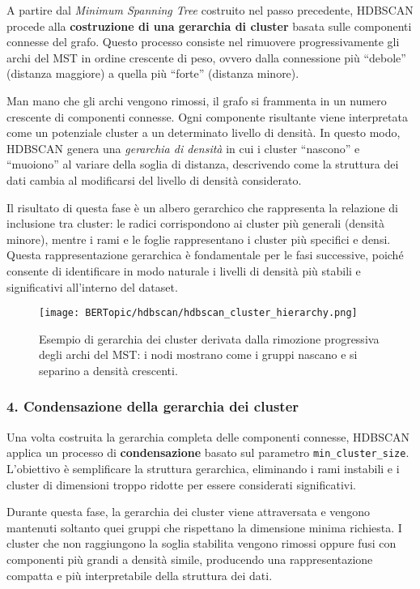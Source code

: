 A partire dal \textit{Minimum Spanning Tree} costruito nel passo precedente, HDBSCAN procede alla \textbf{costruzione di una gerarchia di cluster} basata sulle componenti connesse del grafo. 
Questo processo consiste nel rimuovere progressivamente gli archi del MST in ordine crescente di peso, ovvero dalla connessione più ``debole'' (distanza maggiore) a quella più ``forte'' (distanza minore).

Man mano che gli archi vengono rimossi, il grafo si frammenta in un numero crescente di componenti connesse. 
Ogni componente risultante viene interpretata come un potenziale cluster a un determinato livello di densità. 
In questo modo, HDBSCAN genera una \textit{gerarchia di densità} in cui i cluster ``nascono'' e ``muoiono'' al variare della soglia di distanza, descrivendo come la struttura dei dati cambia al modificarsi del livello di densità considerato.

Il risultato di questa fase è un albero gerarchico che rappresenta la relazione di inclusione tra cluster: 
le radici corrispondono ai cluster più generali (densità minore), mentre i rami e le foglie rappresentano i cluster più specifici e densi. 
Questa rappresentazione gerarchica è fondamentale per le fasi successive, poiché consente di identificare in modo naturale i livelli di densità più stabili e significativi all'interno del dataset.

\begin{figure}[H]
\centering
\texttt{[image: BERTopic/hdbscan/hdbscan\_cluster\_hierarchy.png]}
\caption{Esempio di gerarchia dei cluster derivata dalla rimozione progressiva degli archi del MST: i nodi mostrano come i gruppi nascano e si separino a densità crescenti.}
\label{fig:hdbscan-cluster-hierarchy}
\end{figure}

\subsubsection*{4. Condensazione della gerarchia dei cluster}

Una volta costruita la gerarchia completa delle componenti connesse, HDBSCAN applica un processo di \textbf{condensazione} basato sul parametro \texttt{min\_cluster\_size}. 
L'obiettivo è semplificare la struttura gerarchica, eliminando i rami instabili e i cluster di dimensioni troppo ridotte per essere considerati significativi.

Durante questa fase, la gerarchia dei cluster viene attraversata e vengono mantenuti soltanto quei gruppi che rispettano la dimensione minima richiesta. 
I cluster che non raggiungono la soglia stabilita vengono rimossi oppure fusi con componenti più grandi a densità simile, producendo una rappresentazione compatta e più interpretabile della struttura dei dati.

